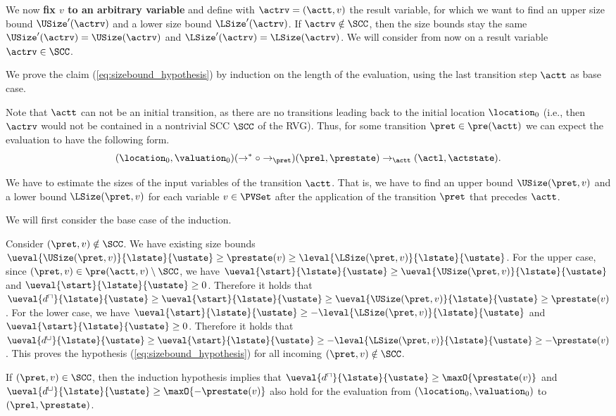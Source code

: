 We now \textbf{fix $v$ to an arbitrary variable} and define with $\actrv = (\actt, v)$ the result variable, for which we want to find an upper size bound $\USize'(\actrv)$ and a lower size bound $\LSize'(\actrv)$. If $\actrv \notin \SCC$, then the size bounds stay the same $\USize'(\actrv) = \USize(\actrv)$ and $\LSize'(\actrv) = \LSize(\actrv)$. We will consider from now on a result variable $\actrv \in \SCC$.

We prove the claim (\ref{eq:sizebound_hypothesis}) by induction on the length of the evaluation, using the last transition step $\actt$ as base case.

Note that $\actt$ can not be an initial transition, as there are no transitions leading back to the initial location $\location_0$
(i.e., then $\actrv$ would not be contained in a nontrivial SCC $\SCC$ of the RVG).
Thus, for some transition $\pret \in \pre(\actt)$ we can expect the evaluation to have the following form.
\[ (\location_0, \valuation_0) (\rightarrow^* \circ \rightarrow_\pret) (\prel, \prestate) \rightarrow_\actt (\actl, \actstate). \]

We have to estimate the sizes of the input variables of the transition $\actt$.
That is, we have to find an upper bound $\USize(\pret, v)$ and a lower bound $\LSize(\pret, v)$ for each variable $v \in \PVSet$ after the application of the transition $\pret$ that precedes $\actt$.

We will first consider the base case of the induction.

Consider $(\pret, v) \notin \SCC$.
We have existing size bounds $\ueval{\USize(\pret, v)}{\lstate}{\ustate} \geq \prestate(v) \geq \leval{\LSize(\pret, v)}{\lstate}{\ustate}$.
For the upper case, since $(\pret, v) \in \pre(\actt, v) \setminus \SCC$, we have $\ueval{\start}{\lstate}{\ustate} \geq \ueval{\USize(\pret, v)}{\lstate}{\ustate}$ and $\ueval{\start}{\lstate}{\ustate} \geq 0$.
Therefore it holds that $\ueval{d^\sqcap}{\lstate}{\ustate} \geq \ueval{\start}{\lstate}{\ustate} \geq \ueval{\USize(\pret, v)}{\lstate}{\ustate} \geq \prestate(v)$.
For the lower case, we have $\ueval{\start}{\lstate}{\ustate} \geq -\leval{\LSize(\pret, v)}{\lstate}{\ustate}$ and $\ueval{\start}{\lstate}{\ustate} \geq 0$.
Therefore it holds that $\ueval{d^\sqcup}{\lstate}{\ustate} \geq \ueval{\start}{\lstate}{\ustate} \geq -\leval{\LSize(\pret, v)}{\lstate}{\ustate} \geq -\prestate(v)$.
This proves the hypothesis (\ref{eq:sizebound_hypothesis}) for all incoming $(\pret, v) \notin \SCC$.

If $(\pret, v) \in \SCC$, then the induction hypothesis implies that $\ueval{d^\sqcap}{\lstate}{\ustate} \geq \maxO{\prestate(v)}$ and $\ueval{d^\sqcup}{\lstate}{\ustate} \geq \maxO{-\prestate(v)}$ also hold for the evaluation from $(\location_0, \valuation_0)$ to $(\prel, \prestate)$.


